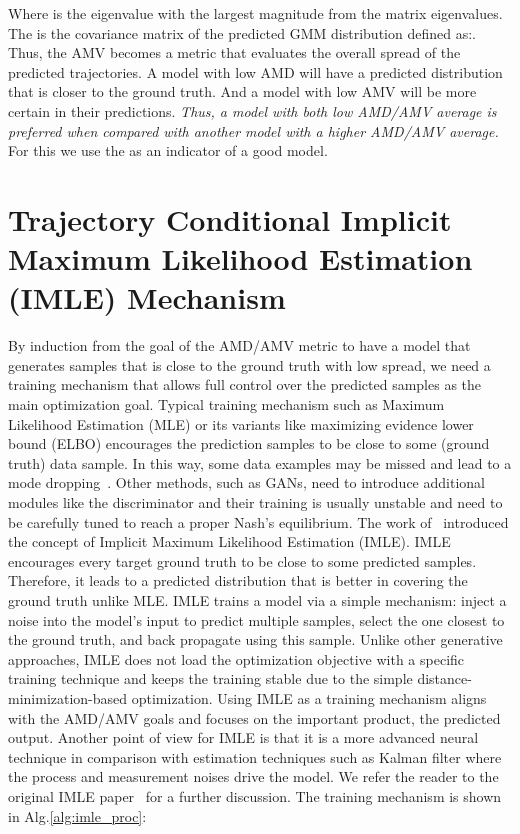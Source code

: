 \documentclass[runningheads]{llncs}
\begin{document}
Where  is the eigenvalue with the largest magnitude from the matrix eigenvalues. The  is the covariance matrix of the predicted GMM distribution defined as:. Thus, the AMV becomes a metric that evaluates the overall spread of the predicted trajectories. A model with low AMD will have a predicted distribution that is closer to the ground truth. And a model with low AMV will be more certain in their predictions. \textit{Thus, a model with both low AMD/AMV average is preferred when compared with another model with a higher AMD/AMV average.} For this we use the  as an indicator of a good model. 

\section{Trajectory Conditional Implicit Maximum Likelihood Estimation (IMLE) Mechanism}
By induction from the goal of the AMD/AMV metric to have a model that generates samples that is close to the ground truth with low spread, we need a training mechanism that allows full control over the predicted samples as the main optimization goal. Typical training mechanism such as Maximum Likelihood Estimation (MLE) or its variants like maximizing evidence lower bound (ELBO) encourages the prediction samples to be close to some (ground truth) data sample. In this way, some data examples may be missed and lead to a mode dropping~\cite{li2018implicit}. Other methods, such as GANs, need to introduce additional modules like the discriminator and their training is usually unstable and need to be carefully tuned to reach a proper Nash's equilibrium. The work of~\cite{li2018implicit} introduced the concept of Implicit Maximum Likelihood Estimation (IMLE). IMLE encourages every target ground truth to be close to some predicted samples. Therefore, it leads to a predicted distribution that is better in covering the ground truth unlike MLE. IMLE trains a model via a simple mechanism: inject a noise into the model's input to predict multiple samples, select the one closest to the ground truth, and back propagate using this sample. Unlike other generative approaches, IMLE does not load the optimization objective with a specific training technique and keeps the training stable due to the simple distance-minimization-based optimization. Using IMLE as a training mechanism aligns with the AMD/AMV goals and focuses on the important product, the predicted output. Another point of view for IMLE is that it is a more advanced neural technique in comparison with estimation techniques such as Kalman filter where the process and measurement noises drive the model. We refer the reader to the original IMLE paper~\cite{li2018implicit} for a further discussion. The training mechanism is shown in Alg.\ref{alg:imle_proc}:
\end{document}

